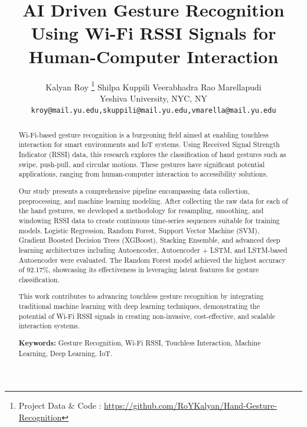 \documentclass[10pt,twocolumn,letterpaper]{article}
\begin{document}
\title{
AI Driven Gesture Recognition Using Wi-Fi RSSI Signals for Human-Computer Interaction}

\author{
Kalyan Roy \thanks{ Project Data \& Code : \url{https://github.com/RoYKalyan/Hand-Gesture-Recognition}}
\hspace{0.3cm} Shilpa Kuppili 
\hspace{0.3cm} Veerabhadra Rao Marellapudi 
\hspace{0.3cm} 
\\
Yeshiva University, NYC, NY\\
{\tt\small kroy@mail.yu.edu,skuppili@mail.yu.edu,vmarella@mail.yu.edu}
}

\maketitle
\ifwacvfinal\thispagestyle{empty}\fi


\begin{abstract}

    Wi-Fi-based gesture recognition is a burgeoning field aimed at enabling touchless interaction for smart environments and IoT systems. Using Received Signal Strength Indicator (RSSI) data, this research explores the classification of hand gestures such as swipe, push-pull, and circular motions. These gestures have significant potential applications, ranging from human-computer interaction to accessibility solutions.

    Our study presents a comprehensive pipeline encompassing data collection, preprocessing, and machine learning modeling. After collecting the raw data for each of the hand gestures, we developed a methodology for resampling, smoothing, and windowing RSSI data to create continuous time-series sequences suitable for training models. Logistic Regression, Random Forest, Support Vector Machine (SVM), Gradient Boosted Decision Trees (XGBoost), Stacking Ensemble, and advanced deep learning architectures including Autoencoder, Autoencoder + LSTM, and LSTM-based Autoencoder were evaluated. The Random Forest model achieved the highest accuracy of 92.17\%, showcasing its effectiveness in leveraging latent features for gesture classification.

    This work contributes to advancing touchless gesture recognition by integrating traditional machine learning with deep learning techniques, demonstrating the potential of Wi-Fi RSSI signals in creating non-invasive, cost-effective, and scalable interaction systems.

    \textbf{Keywords:} Gesture Recognition, Wi-Fi RSSI, Touchless Interaction, Machine Learning, Deep Learning, IoT.

\end{abstract}
\end{document}

